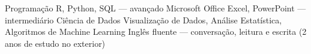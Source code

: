 \begin{cvskills}
  \cvskill
    {Programação}
    {R, Python, SQL — avançado}
  \cvskill
    {Microsoft Office}
    {Excel, PowerPoint — intermediário}
  \cvskill
    {Ciência de Dados}
    {Visualização de Dados, Análise Estatística, Algoritmos de Machine Learning}
  \cvskill
    {Inglês}
    {fluente — conversação, leitura e escrita (2 anos de estudo no exterior)}
    
\end{cvskills}
